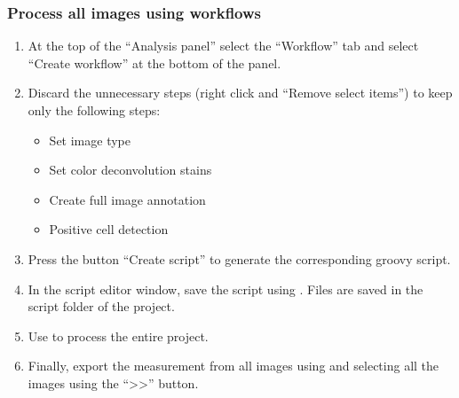 \documentclass[a4paper,DIV=17,dvipsnames,headsepline]{scrartcl}
\begin{document}

\subsubsection{Process all images using workflows}
\begin{enumerate}
\item At the top of the ``Analysis panel'' select the ``Workflow'' tab and select ``Create workflow'' at the bottom of the panel.
\item Discard the unnecessary steps (right click and ``Remove select items'')  to keep only the following steps:
\begin{itemize}
\item Set image type
\item Set color deconvolution stains
\item Create full image annotation
\item Positive cell detection
\end{itemize}
\item Press the button ``Create script'' to generate the corresponding groovy script.
\item In the script editor window, save the script using . Files are saved in the script folder of the project. 
\item Use  to process the entire project.
\item Finally, export the measurement from all images using  and selecting all the images using the ``>>'' button.


\end{enumerate}
\end{document}
